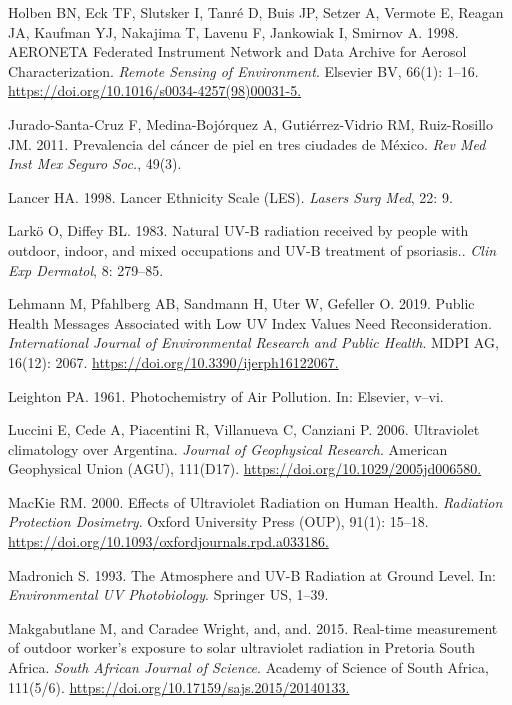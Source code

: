 \documentclass[10pt]{article}
\begin{document}
\label{csl:65}Holben BN, Eck TF, Slutsker I, Tanr{\'{e}} D, Buis JP, Setzer A, Vermote E, Reagan JA, Kaufman YJ, Nakajima T, Lavenu F, Jankowiak I, Smirnov A. 1998. {{AERONET}{\textemdash}A Federated Instrument Network and Data Archive for Aerosol Characterization}. \textit{Remote Sensing of Environment}. Elsevier {BV}, 66(1): 1–16. \url{https://doi.org/10.1016/s0034-4257(98)00031-5.}

\label{csl:37}Jurado-Santa-Cruz F, Medina-Bojórquez A, Gutiérrez-Vidrio RM, Ruiz-Rosillo JM. 2011. {Prevalencia del cáncer de piel en tres ciudades de México}. \textit{Rev Med Inst Mex Seguro Soc.}, 49(3).

\label{csl:46}Lancer HA. 1998. {Lancer Ethnicity Scale (LES)}. \textit{Lasers Surg Med}, 22: 9.

\label{csl:51}Larkö O, Diffey BL. 1983. {Natural UV-B radiation received by people with outdoor, indoor, and mixed occupations and UV-B treatment of psoriasis.}. \textit{Clin Exp Dermatol}, 8: 279–85.

\label{csl:33}Lehmann M, Pfahlberg AB, Sandmann H, Uter W, Gefeller O. 2019. {Public Health Messages Associated with Low {UV} Index Values Need Reconsideration}. \textit{International Journal of Environmental Research and Public Health}. {MDPI} {AG}, 16(12): 2067. \url{https://doi.org/10.3390/ijerph16122067.}

\label{csl:9}Leighton PA. 1961. {Photochemistry of Air Pollution}. In: Elsevier, v--vi.

\label{csl:58}Luccini E, Cede A, Piacentini R, Villanueva C, Canziani P. 2006. {Ultraviolet climatology over Argentina}. \textit{Journal of Geophysical Research}. American Geophysical Union ({AGU}), 111(D17). \url{https://doi.org/10.1029/2005jd006580.}

\label{csl:34}MacKie RM. 2000. {Effects of Ultraviolet Radiation on Human Health}. \textit{Radiation Protection Dosimetry}. Oxford University Press ({OUP}), 91(1): 15–18. \url{https://doi.org/10.1093/oxfordjournals.rpd.a033186.}

\label{csl:55}Madronich S. 1993. {The Atmosphere and {UV}-B Radiation at Ground Level}. In: \textit{Environmental {UV} Photobiology}. Springer {US}, 1–39.

\label{csl:52}Makgabutlane M, and Caradee Wright, and, and. 2015. {Real-time measurement of outdoor worker's exposure to solar ultraviolet radiation in Pretoria South Africa}. \textit{South African Journal of Science}. Academy of Science of South Africa, 111(5/6). \url{https://doi.org/10.17159/sajs.2015/20140133.}
\end{document}
